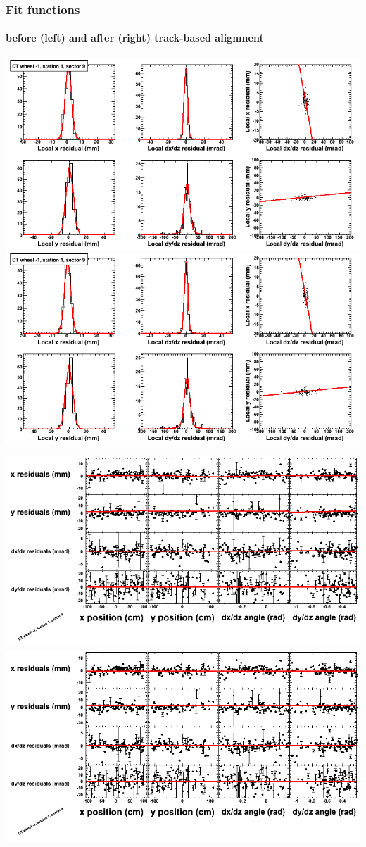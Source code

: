 \documentclass[compress]{beamer}
\begin{document}
\begin{frame}
\frametitle{Fit functions}
\framesubtitle{before (left) and after (right) track-based alignment}
\includegraphics[width=0.5\linewidth]{fitfunctions_re01/MBwhBst1sec09_bellcurves.png} \includegraphics[width=0.5\linewidth]{fitfunctions_re05/MBwhBst1sec09_bellcurves.png}

\includegraphics[width=0.5\linewidth]{fitfunctions_re01/MBwhBst1sec09_polynomials.png} \includegraphics[width=0.5\linewidth]{fitfunctions_re05/MBwhBst1sec09_polynomials.png}
\end{frame}
\end{document}
